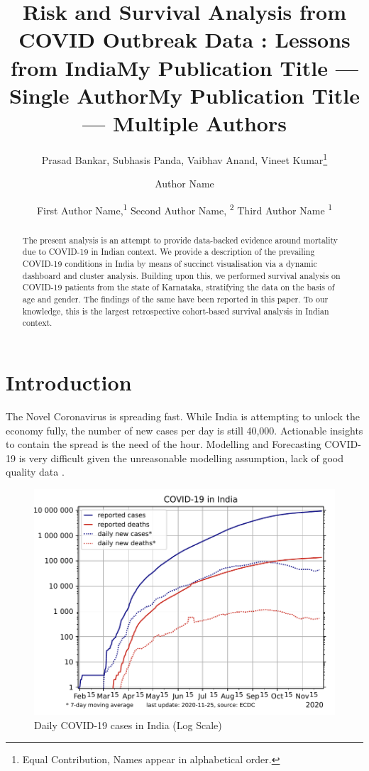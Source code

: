 \documentclass[letterpaper]{article} %
\title{Risk and Survival Analysis from COVID Outbreak Data : Lessons from India}
\author{
	Prasad Bankar\textsuperscript{\rm *}, Subhasis Panda\textsuperscript{\rm *}, Vaibhav Anand\textsuperscript{\rm *},  Vineet Kumar\footnote{Equal Contribution, Names appear in alphabetical order.}
	\\
}
\title{My Publication Title --- Single Author}
\author {
	Author Name \\
}
\title{My Publication Title --- Multiple Authors}
\author {
	First Author Name,\textsuperscript{\rm 1}
	Second Author Name, \textsuperscript{\rm 2}
	Third Author Name \textsuperscript{\rm 1} \\
}
\begin{document}
	
	\maketitle
	
	\begin{abstract}
		
		The present analysis is an attempt to provide data-backed evidence around mortality due to COVID-19 in Indian context. We provide a description of the prevailing COVID-19 conditions in India by means of succinct visualisation via a dynamic dashboard and cluster analysis. Building upon this, we performed survival analysis on COVID-19 patients from the state of Karnataka, stratifying the data on the basis of age and gender. The findings of the same have been reported in this paper. To our knowledge, this is the largest retrospective cohort-based survival analysis in Indian context.
	\end{abstract}
	\section{Introduction}
	\noindent The Novel Coronavirus is spreading fast. While India is attempting to unlock the economy fully, the number of new cases per day is still 40,000. Actionable insights to contain the spread is the need of the hour.
	Modelling and Forecasting COVID-19 is very difficult given the unreasonable modelling assumption, lack of good quality data \cite{ioannidis2020forecasting}. 
	
	
	\begin{figure}[h]
		\centering
		\includegraphics[width=0.95\linewidth]{log-case}
		\caption{Daily COVID-19 cases in India (Log Scale)}
		\label{fig:india-log}
	\end{figure}
	
\end{document}
